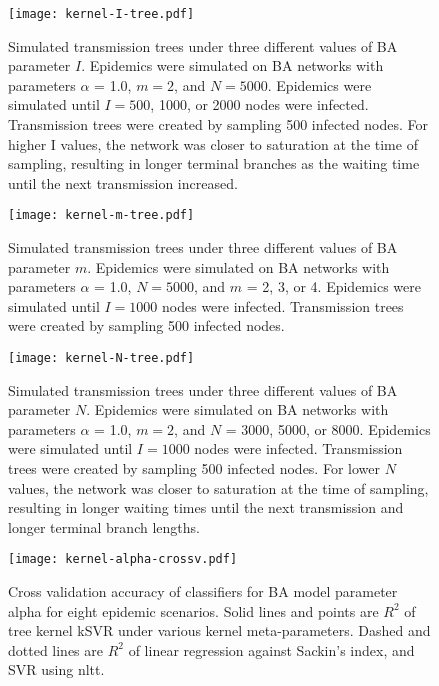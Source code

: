 \begin{figure}[ht]
  \centering
  \texttt{[image: kernel-I-tree.pdf]}
  \caption[Simulated transmission trees under three different values of BA parameter $I$]{
    Simulated transmission trees under three different values of BA parameter
    $I$. Epidemics were simulated on \gls{BA} networks with parameters $\alpha$
    = 1.0, $m = 2$, and $N = 5000$. Epidemics were simulated until $I = 500$,
    1000, or 2000 nodes were infected. Transmission trees were created by
    sampling 500 infected nodes. For higher \gls{I} values, the network was
    closer to saturation at the time of sampling, resulting in longer terminal
    branches as the waiting time until the next transmission increased.
  }
  \label{fig:Itrees}
\end{figure}

\begin{figure}[ht]
  \centering
  \texttt{[image: kernel-m-tree.pdf]}
  \caption[Simulated transmission trees under three different values of BA parameter $m$]{
    Simulated transmission trees under three different values of BA parameter
    $m$. Epidemics were simulated on \gls{BA} networks with parameters $\alpha$
    = 1.0, $N = 5000$, and $m$ = 2, 3, or 4. Epidemics were simulated until $I
    = 1000$ nodes were infected. Transmission trees were created by sampling
    500 infected nodes.
  }
  \label{fig:mtrees}
\end{figure}

\begin{figure}[ht]
  \centering
  \texttt{[image: kernel-N-tree.pdf]}
  \caption[Simulated transmission trees under three different values of BA parameter $N$]{
    Simulated transmission trees under three different values of BA parameter
    $N$. Epidemics were simulated on \gls{BA} networks with parameters $\alpha$
    = 1.0, $m = 2$, and $N$ = 3000, 5000, or 8000. Epidemics were simulated
    until $I = 1000$ nodes were infected. Transmission trees were created by
    sampling 500 infected nodes. For lower $N$ values, the network was closer
    to saturation at the time of sampling, resulting in longer waiting times
    until the next transmission and longer terminal branch lengths.
  }
  \label{fig:Ntrees}
\end{figure}

\begin{figure}[ht]
  \centering
  \texttt{[image: kernel-alpha-crossv.pdf]}
  \caption[Cross validation accuracy of classifiers for \gls{BA} model parameter
    \gls{alpha} for eight epidemic scenarios.]
  {
    Cross validation accuracy of classifiers for \gls{BA} model parameter
    \gls{alpha} for eight epidemic scenarios. Solid lines and points are
    $R^2$ of tree kernel \gls{kSVR} under various kernel meta-parameters.
    Dashed and dotted lines are $R^2$ of linear regression against Sackin's
    index, and \gls{SVR} using \gls{nltt}.
  }
  \label{fig:alphacrossv}
\end{figure}

